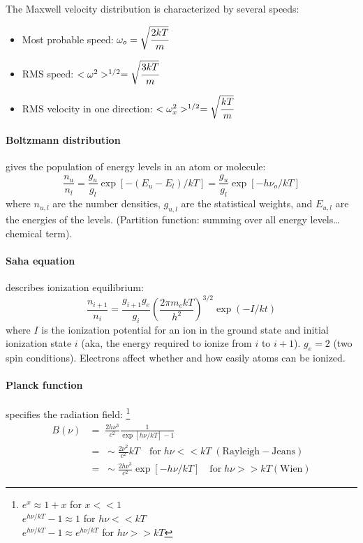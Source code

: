 \documentclass[12pt]{article}
\begin{document}
The Maxwell velocity distribution is characterized by several speeds:
\begin{itemize}[itemsep=1ex]
    \item Most probable speed: $\omega_{o} = \sqrt{\cfrac{2kT}{m}}$
    \item RMS speed: $<\omega^{2}>^{1/2} = \sqrt{\cfrac{3kT}{m}}$
    \item RMS velocity in one direction:
        $<\omega_{x}^{2}>^{1/2} = \sqrt{\cfrac{kT}{m}}$
\end{itemize}
\paragraph{Boltzmann distribution}
gives the
population of energy levels in an atom or molecule:$${
    \frac{n_{u}}{n_{l}} =
    \frac{g_{u}}{g_{l}}\exp\left[-\left(E_{u}-E_{l}\right)/kT\right] =
    \frac{g_{u}}{g_{l}}\exp\left[-h\nu_{o}/kT\right]
}$$
where $n_{u,l}$ are the number densities, $g_{u,l}$ are the
statistical weights, and $E_{u,l}$ are the energies of the levels.
(Partition function: summing over all energy levels\ldots chemical
term).

\paragraph{Saha equation} describes ionization equilibrium:$${
    \frac{n_{i+1}}{n_{i}} = \frac{g_{i+1}g_{e}}{g_{i}}
    \left(\frac{2\pi m_{e}kT}{h^{2}}\right)^{3/2}
    \exp\left(-I/kt\right)
}$$
where $I$ is the ionization potential for an ion in the ground state
and initial ionization state $i$ (aka, the energy required to ionize
from $i$ to $i+1$). $g_{e} = 2$ (two spin conditions). Electrons
affect whether and how easily atoms can be ionized.

\paragraph{Planck function} specifies the radiation field:
\footnote{
    $e^{x} \approx 1+x$ for $x<<1$\\
    $e^{h\nu/kT}-1 \approx 1$ for $h\nu<<kT$\\
    $e^{h\nu/kT}-1 \approx e^{h\nu/kT}$ for $h\nu>>kT$}
\begin{align*}
    B(\nu) &= \;\frac{2h\nu^{3}}{c^{2}}\frac{1}{\exp[h\nu/kT]-1}\\
    &= \;\sim \frac{2\nu^{2}}{c^{2}}kT\quad \mathrm{for}\;h\nu<<kT\;
    (\mathrm{Rayleigh-Jeans})\\
    &= \;\sim \frac{2h\nu^{3}}{c^{2}}\exp[-h\nu/kT]\quad\mathrm{for}\;h\nu>>kT
    (\mathrm{Wien})
\end{align*}
\end{document}
